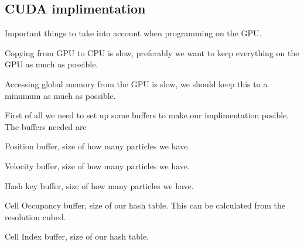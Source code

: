 \subsection*{C\-U\-D\-A implimentation }

Important things to take into account when programming on the G\-P\-U.\par

\begin{DoxyItemize}
\item Copying from G\-P\-U to C\-P\-U is slow, preferably we want to keep everything on the G\-P\-U as much as possible.
\item Accessing global memory from the G\-P\-U is slow, we should keep this to a minumum as much as possible. \par
First of all we need to set up some buffers to make our implimentation posible. The buffers needed are
\item Position buffer, size of how many particles we have.
\item Velocity buffer, size of how many particles we have.
\item Hash key buffer, size of how many particles we have.
\item Cell Occupancy buffer, size of our hash table. This can be calculated from the resolution cubed.
\item Cell Index buffer, size of our hash table. \par

\end{DoxyItemize}
